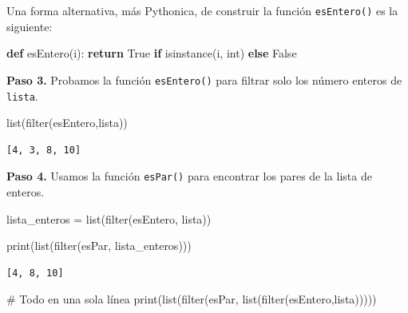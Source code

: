 \documentclass[
  spanish,
  letterpaper,
]{scrbook}
\newenvironment{Shaded}{\begin{snugshade}}{\end{snugshade}}
\newcommand{\BuiltInTok}[1]{\textcolor[rgb]{0.00,0.23,0.31}{#1}}
\newcommand{\CommentTok}[1]{\textcolor[rgb]{0.37,0.37,0.37}{#1}}
\newcommand{\ControlFlowTok}[1]{\textcolor[rgb]{0.00,0.23,0.31}{\textbf{#1}}}
\newcommand{\KeywordTok}[1]{\textcolor[rgb]{0.00,0.23,0.31}{\textbf{#1}}}
\newcommand{\NormalTok}[1]{\textcolor[rgb]{0.00,0.23,0.31}{#1}}
\newcommand{\OperatorTok}[1]{\textcolor[rgb]{0.37,0.37,0.37}{#1}}
\newcommand{\VariableTok}[1]{\textcolor[rgb]{0.07,0.07,0.07}{#1}}
\theoremstyle{definition}
\theoremstyle{remark}
\begin{document}
Una forma alternativa, más Pythonica, de construir la función
\texttt{esEntero()} es la siguiente:

\begin{Shaded}
\begin{Highlighting}[]
\KeywordTok{def}\NormalTok{ esEntero(i):}
    \ControlFlowTok{return} \VariableTok{True} \ControlFlowTok{if} \BuiltInTok{isinstance}\NormalTok{(i, }\BuiltInTok{int}\NormalTok{) }\ControlFlowTok{else} \VariableTok{False}
\end{Highlighting}
\end{Shaded}

\textbf{Paso 3.} Probamos la función \texttt{esEntero()} para filtrar
solo los número enteros de \texttt{lista}.

\begin{Shaded}
\begin{Highlighting}[]
\BuiltInTok{list}\NormalTok{(}\BuiltInTok{filter}\NormalTok{(esEntero,lista))}
\end{Highlighting}
\end{Shaded}

\begin{verbatim}
[4, 3, 8, 10]
\end{verbatim}

\textbf{Paso 4.} Usamos la función \texttt{esPar()} para encontrar los
pares de la lista de enteros.

\begin{Shaded}
\begin{Highlighting}[]
\NormalTok{lista\_enteros }\OperatorTok{=} \BuiltInTok{list}\NormalTok{(}\BuiltInTok{filter}\NormalTok{(esEntero, lista))}

\BuiltInTok{print}\NormalTok{(}\BuiltInTok{list}\NormalTok{(}\BuiltInTok{filter}\NormalTok{(esPar, lista\_enteros)))}
\end{Highlighting}
\end{Shaded}

\begin{verbatim}
[4, 8, 10]
\end{verbatim}

\begin{Shaded}
\begin{Highlighting}[]
\CommentTok{\# Todo en una sola línea}
\BuiltInTok{print}\NormalTok{(}\BuiltInTok{list}\NormalTok{(}\BuiltInTok{filter}\NormalTok{(esPar, }\BuiltInTok{list}\NormalTok{(}\BuiltInTok{filter}\NormalTok{(esEntero,lista)))))}
\end{Highlighting}
\end{Shaded}
\end{document}
